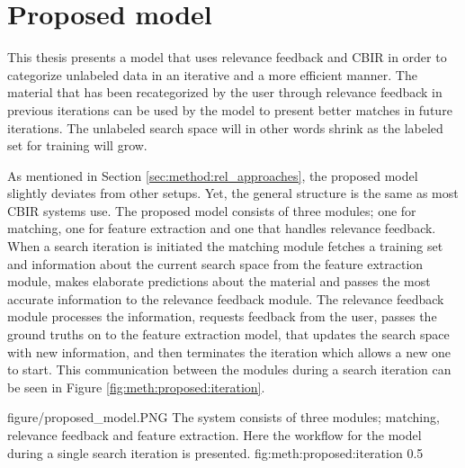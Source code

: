 \section{Proposed model}
\label{sec:method:proposed}
This thesis presents a model that uses relevance feedback and CBIR in order to categorize unlabeled data in an iterative and a more efficient manner. The material that has been recategorized by the user through relevance feedback in previous iterations can be used by the model to present better matches in future iterations. The unlabeled search space will in other words shrink as the labeled set for training will grow.

As mentioned in Section \ref{sec:method:rel_approaches}, the proposed model slightly deviates from other setups. Yet, the general structure is the same as most CBIR systems use. The proposed model consists of three modules; one for matching, one for feature extraction and one that handles relevance feedback. When a search iteration is initiated the matching module fetches a training set and information about the current search space from the feature extraction module, makes elaborate predictions about the material and passes the most accurate information to the relevance feedback module. The relevance feedback module processes the information, requests feedback from the user, passes the ground truths on to the feature extraction model, that updates the search space with new information, and then terminates the iteration which allows a new one to start. This communication between the modules during a search iteration can be seen in Figure \ref{fig:meth:proposed:iteration}. 

\singlefigure
{figure/proposed_model.PNG}
{The system consists of three modules; matching, relevance feedback and feature extraction. Here the workflow for the model during a single search iteration is presented.}
{fig:meth:proposed:iteration}
{0.5}




